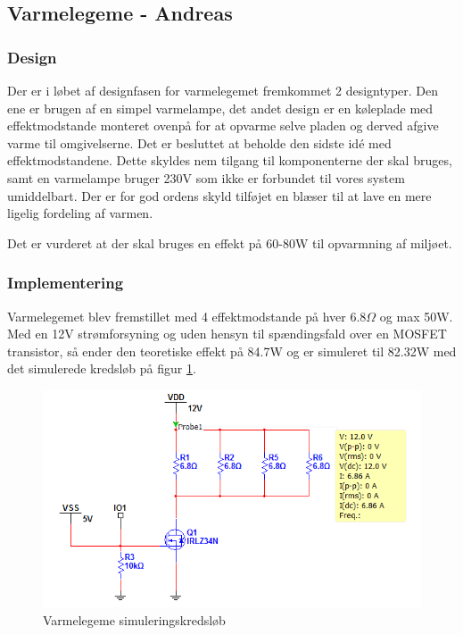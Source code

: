 \newpage
\subsection{Varmelegeme - Andreas}
\subsubsection{Design}
Der er i løbet af designfasen for varmelegemet fremkommet 2 designtyper. Den ene er brugen af en simpel varmelampe, det andet design er en køleplade med effektmodstande monteret ovenpå for at opvarme selve pladen og derved afgive varme til omgivelserne. Det er besluttet at beholde den sidste idé med effektmodstandene. Dette skyldes nem tilgang til komponenterne der skal bruges, samt en varmelampe bruger 230V som ikke er forbundet til vores system umiddelbart.
Der er for god ordens skyld tilføjet en blæser til at lave en mere ligelig fordeling af varmen.

Det er vurderet at der skal bruges en effekt på 60-80W til opvarmning af miljøet.

\subsubsection{Implementering}
Varmelegemet blev fremstillet med 4 effektmodstande på hver 6.8$\Omega$ og max 50W. Med en 12V strømforsyning og uden hensyn til spændingsfald over en MOSFET transistor, så ender den teoretiske effekt på 84.7W og er simuleret til 82.32W med det simulerede kredsløb på figur \ref{fig:Heater_simulation}.

\begin{figure}[H]
\centering
\includegraphics[page=1,width=\linewidth,viewport=-50mm 5mm 180mm 80mm]{./7_projektbeskrivelse/design_og_implementering/hardware/sim_heat.png}
\caption[Figur]{Varmelegeme simuleringskredsløb}
\label{fig:Heater_simulation}
\end{figure}

